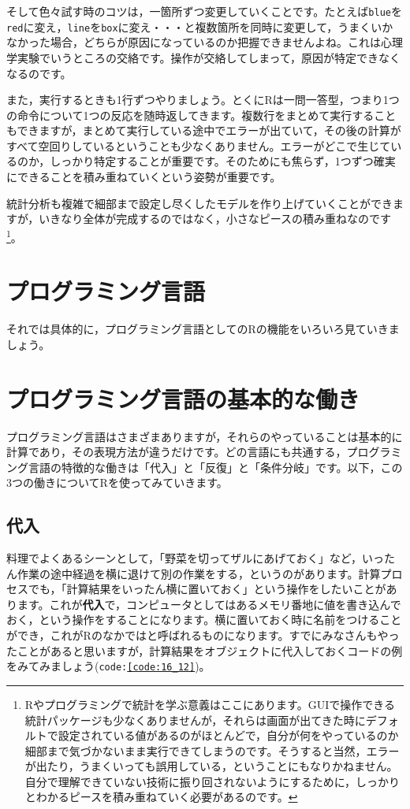\documentclass{ltjsbook}
\begin{document}
そして色々試す時のコツは，一箇所ずつ変更していくことです。たとえば\texttt{blue}を\texttt{red}に変え，\texttt{line}を\texttt{box}に変え・・・と複数箇所を同時に変更して，うまくいかなかった場合，どちらが原因になっているのか把握できませんよね。これは心理学実験でいうところの交絡です。操作が交絡してしまって，原因が特定できなくなるのです。

また，実行するときも1行ずつやりましょう。とくにRは一問一答型，つまり1つの命令について1つの反応を随時返してきます。複数行をまとめて実行することもできますが，まとめて実行している途中でエラーが出ていて，その後の計算がすべて空回りしているということも少なくありません。エラーがどこで生じているのか，しっかり特定することが重要です。そのためにも焦らず，1つずつ確実にできることを積み重ねていくという姿勢が重要です。

統計分析も複雑で細部まで設定し尽くしたモデルを作り上げていくことができますが，いきなり全体が完成するのではなく，小さなピースの積み重ねなのです\footnote{Rやプログラミングで統計を学ぶ意義はここにあります。GUIで操作できる統計パッケージも少なくありませんが，それらは画面が出てきた時にデフォルトで設定されている値があるのがほとんどで，自分が何をやっているのか細部まで気づかないまま実行できてしまうのです。そうすると当然，エラーが出たり，うまくいっても誤用している，ということにもなりかねません。自分で理解できていない技術に振り回されないようにするために，しっかりとわかるピースを積み重ねていく必要があるのです。}。


\section{プログラミング言語}

それでは具体的に，プログラミング言語としてのRの機能をいろいろ見ていきましょう。
\section{プログラミング言語の基本的な働き}
プログラミング言語はさまざまありますが，それらのやっていることは基本的に計算であり，その表現方法が違うだけです。どの言語にも共通する，プログラミング言語の特徴的な働きは「代入」と「反復」と「条件分岐」です。以下，この3つの働きについてRを使ってみていきます。
\subsection{代入}
料理でよくあるシーンとして，「野菜を切ってザルにあげておく」など，いったん作業の途中経過を横に退けて別の作業をする，というのがあります。計算プロセスでも，「計算結果をいったん横に置いておく」という操作をしたいことがあります。これが\textbf{代入}で，コンピュータとしてはあるメモリ番地に値を書き込んでおく，という操作をすることになります。横に置いておく時に名前をつけることができ，これがRのなかではと呼ばれるものになります。すでにみなさんもやったことがあると思いますが，計算結果をオブジェクトに代入しておくコードの例をみてみましょう(\texttt{code:\ref{code:16_12}})。
\end{document}
